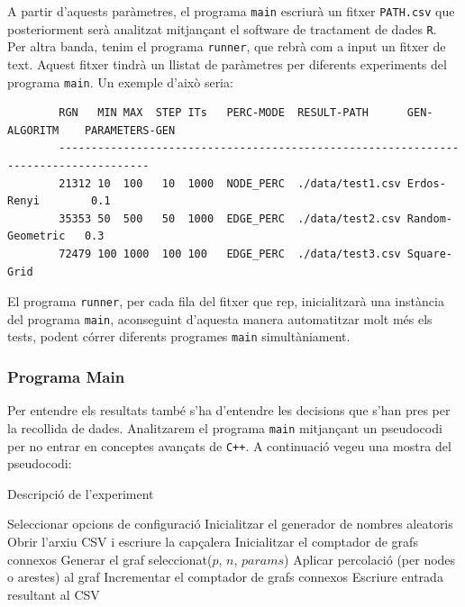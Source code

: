 \documentclass[a4paper]{article}
\begin{document}
	A partir d'aquests paràmetres, el programa \texttt{main} escriurà un fitxer \texttt{PATH.csv} que posteriorment serà analitzat mitjançant el software de tractament de dades \texttt{R}. \\
	
	Per altra banda, tenim el programa \texttt{runner}, que rebrà com a input un fitxer de text. Aquest fitxer tindrà un llistat de paràmetres per diferents experiments del programa \texttt{main}. Un exemple d'això seria:
	
	\begin{verbatim}
		RGN   MIN MAX  STEP ITs   PERC-MODE  RESULT-PATH      GEN-ALGORITM    PARAMETERS-GEN
		------------------------------------------------------------------------------------
		21312 10  100   10  1000  NODE_PERC  ./data/test1.csv Erdos-Renyi        0.1
		35353 50  500   50  1000  EDGE_PERC  ./data/test2.csv Random-Geometric   0.3
		72479 100 1000  100 100   EDGE_PERC  ./data/test3.csv Square-Grid
	\end{verbatim}
	
	El programa \texttt{runner}, per cada fila del fitxer que rep, inicialitzarà una instància del programa \texttt{main}, aconseguint d'aquesta manera automatitzar molt més els tests, podent córrer diferents programes \texttt{main} simultàniament. \\
	
	\subsubsection{Programa Main}
	
	Per entendre els resultats també s'ha d'entendre les decisions que s'han pres per la recollida de dades. Analitzarem el programa \texttt{main} mitjançant un pseudocodi per no entrar en conceptes avançats de \texttt{C++}. A continuació vegeu una mostra del pseudocodi: \\
	
	\begin{algorithm} [H]
		\caption{Descripció de l'experiment}
		\begin{algorithmic}[1]
			\State Seleccionar opcions de configuració
			\State Inicialitzar el generador de nombres aleatoris
			\State Obrir l'arxiu CSV i escriure la capçalera
			\State Inicialitzar el comptador de grafs connexos
			\Repeat
			\State Generar el graf seleccionat($p$, $n$, $params$)
			\State Aplicar percolació (per nodes o arestes) al graf
			\State Incrementar el comptador de grafs connexos
			\EndIf
			\EndFor
			\State Escriure entrada resultant al CSV
			\EndFor
			\EndFor
		\end{algorithmic}
	\end{algorithm}
	
\end{document}
